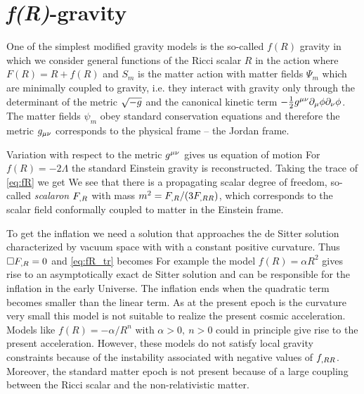 \section{\textit{f(R)}-gravity}
One of the simplest modified gravity models is the so-called $f(R)$ gravity in which we consider general functions of the Ricci scalar $R$ in the action
where $F(R)=R+f(R)$ and $S_m$ is the matter action with matter fields $\Psi_m$ which are minimally coupled to gravity, i.e. they interact with gravity only through the determinant of the metric $\sqrt{-g}$ and the canonical kinetic term $-\frac12g^{\mu\nu}\partial_\mu\phi\partial_\nu\phi$. The matter fields $\psi_m$ obey standard conservation equations and therefore the metric $g_{\mu\nu}$ corresponds to the physical frame -- the Jordan frame.

Variation with respect to the metric $g^{\mu\nu}$ gives us equation of motion
For $f(R)=-2\Lambda$ the standard Einstein gravity is reconstructed. Taking the trace of \eqref{eq:fR} we get
We see that there is a propagating scalar degree of freedom, so-called \textit{scalaron} $F_{,R}$ with mass $m^2=F_{,R}/(3F_{,RR})$, which corresponds to the scalar field conformally coupled to matter in the Einstein frame.

To get the inflation we need a solution that approaches the de Sitter solution characterized by vacuum space with with a constant positive curvature. Thus $\Box F_{,R}=0$ and \eqref{eq:fR_tr} becomes
For example the model $f(R)=\alpha R^2$ gives rise to an asymptotically exact de Sitter solution and can be responsible for the inflation in the early Universe. The inflation ends when the quadratic term becomes smaller than the linear term. As at the present epoch is the curvature very small this model is not suitable to realize the present cosmic acceleration. Models like $f(R)=-\alpha/R^n$ with $\alpha>0,\ n>0$ could in principle give rise to the present acceleration. However, these models do not satisfy local gravity constraints because of the instability associated with negative values of $f_{,RR}$. Moreover, the standard matter epoch is not present because of a large coupling between the Ricci scalar and the non-relativistic matter.

